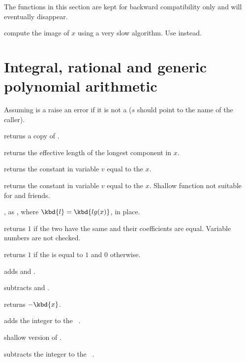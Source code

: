 
The functions in this section are kept for backward compatibility only
and will eventually disappear.

 compute the image of $x$ using a very slow
algorithm. Use  instead.

\section{Integral, rational and generic polynomial arithmetic}


 Assuming  is a 
raise an error if it is not a  ($s$ should point to the name of the
caller).

 returns a copy of .

 returns the effective length of the longest
component in $x$.

 returns the constant  in variable
$v$ equal to the  $x$.

 returns the constant  in
variable $v$ equal to the  $x$. Shallow function not suitable for
 and friends.

, as , where
$\kbd{l} = \kbd{lg(x)}$, in place.

 returns $1$ if the two  have
the same  and their coefficients are equal. Variable numbers are
not checked.

 returns $1$ if the  is equal to $1$
and $0$ otherwise.

 adds  and .

 subtracts  and .

 returns $-\kbd{x}$.

 adds the integer  to the
~.

 shallow version of .

 subtracts the integer  to the
~.

